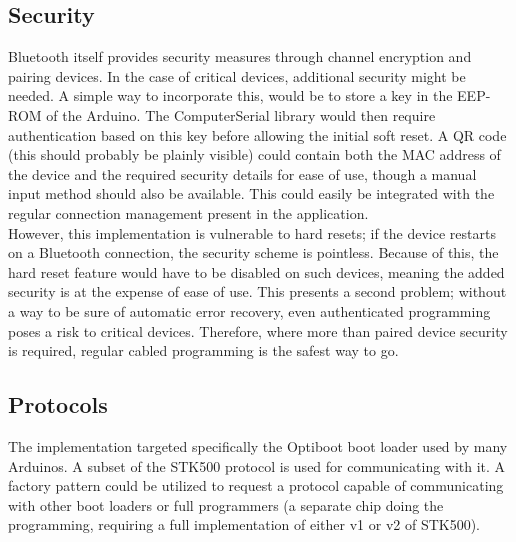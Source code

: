     \subsection{Security}
	Bluetooth itself provides security measures through channel encryption and pairing devices. In the case of
    critical devices, additional security might be needed. A simple way to incorporate this, would be to store a
    key in the EEP-ROM of the Arduino. The ComputerSerial library would then require authentication based on this
    key before allowing the initial soft reset. A QR code (this should probably be plainly visible) could contain
    both the MAC address of the device and the required security details for ease of use, though a manual input
    method should also be available. This could easily be integrated with the regular connection management present
    in the application.\\
    
    However, this implementation is vulnerable to hard resets; if the device restarts on a Bluetooth connection, the
    security scheme is pointless. Because of this, the hard reset feature would have to be disabled on such devices,
    meaning the added security is at the expense of ease of use. This presents a second problem; without a way to be
    sure of automatic error recovery, even authenticated programming poses a risk to critical devices.
    Therefore, where more than paired device security is required, regular cabled programming is the safest way to go.
    
    \subsection{Protocols}
    The implementation targeted specifically the Optiboot boot loader used by many Arduinos. A subset of the STK500
    protocol is used for communicating with it. A factory pattern could be utilized to request a protocol capable of
    communicating with other boot loaders or full programmers (a separate chip doing the programming, requiring a
    full implementation of either v1 or v2 of STK500).

